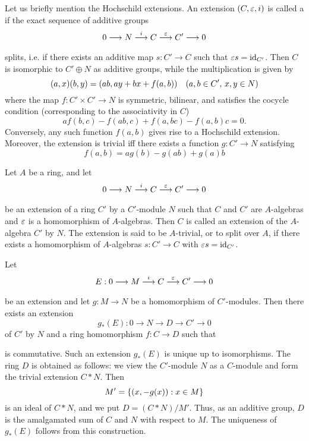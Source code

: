 \documentclass[../main]{subfiles}
\begin{document}
\newparagraph
Let us briefly mention the Hochschild extensions. An extension $(C,\varepsilon,i)$ is called a  if the exact sequence of additive groups \[0\longrightarrow N\varrightarrow iC\varrightarrow\ep C'\longrightarrow0\] splits, i.e. if there exists an additive map $s:C'\longrightarrow C$ such that $\varepsilon s=\operatorname{id}_{C'}$. Then $C$ is isomorphic to $C'\oplus N$ as additive groups, while the multiplication is given by
\[(a,x)(b,y) = (ab,ay+bx+f(a,b))\for{a,b\in C',\, x,y\in N}\]
where the map $f:C'\times C'\longrightarrow N$ is symmetric, bilinear, and satisfies the cocycle condition (corresponding to the associativity in $C$)
\[af(b,c) - f(ab,c) + f(a,bc) - f(a,b)c = 0.\]
Conversely, any such function $f(a,b)$ gives rise to a Hochschild extension. Moreover, the extension is trivial iff there exists a function $g:C'\longrightarrow N$ satisfying
\[f(a,b) = ag(b) - g(ab) + g(a)b\]

\newparagraph
Let $A$ be a ring, and let \[0\longrightarrow N\varrightarrow iC\varrightarrow\ep C'\longrightarrow0\] be an extension of a ring $C'$ by a $C'$-module $N$ such that $C$ and $C'$ are $A$-algebras and $\varepsilon$ is a homomorphism of $A$-algebras. Then $C$ is called an extension of the $A$-algebra $C'$ by $N$. The extension is said to be $A$-trivial, or to split over $A$, if there exists a homomorphism of $A$-algebras $s:C'\longrightarrow C$ with $\varepsilon s=\operatorname{id}_{C'}$.

\newparagraph
Let \[E:0\longrightarrow M\varrightarrow iC\varrightarrow\ep C'\longrightarrow0\]
be an extension and let $g:M\longrightarrow N$ be a homomorphism of $C'$-modules. Then there exists an extension \[g_*(E):0\longrightarrow N\longrightarrow D\longrightarrow C'\longrightarrow0\]
of $C'$ by $N$ and a ring homomorphism $f:C\longrightarrow D$ such that
\begin{center}
\end{center}
is commutative. Such an extension $g_*(E)$ is unique up to isomorphisms. The ring $D$ is obtained as follows: we view the $C'$-module $N$ as a $C$-module and form the trivial extension $C*N$. Then
\[M' = \left\{(x,-g(x)): x\in M\right\}\]
is an ideal of $C*N$, and we put $D=(C*N)/M'$. Thus, as an additive group, $D$ is the amalgamated sum of $C$ and $N$ with respect to $M$. The uniqueness of $g_*(E)$ follows from this construction.
\end{document}
